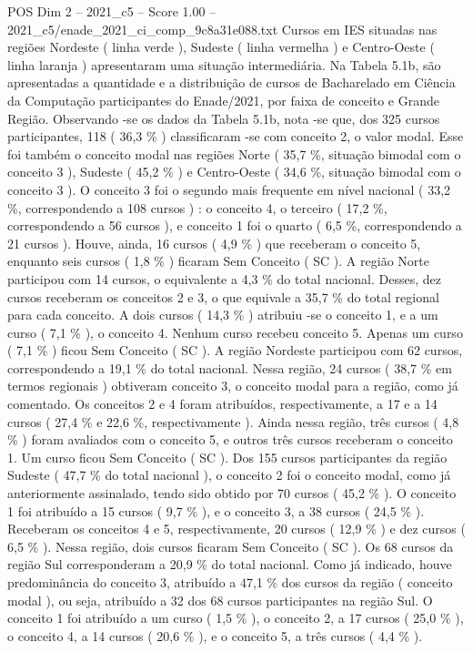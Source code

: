 \begin{textsample}{POS Dim 2 – 2021\_c5 – Score 1.00 – 2021\_c5/enade\_2021\_ci\_comp\_9c8a31e088.txt}
Cursos em IES situadas nas regiões Nordeste ( linha verde ), Sudeste ( linha vermelha ) e Centro-Oeste ( linha laranja ) apresentaram uma situação intermediária.
Na Tabela 5.1b, são apresentadas a quantidade e a distribuição de cursos de Bacharelado em Ciência da Computação participantes do Enade/2021, por faixa de conceito e Grande Região.
Observando -se os dados da Tabela 5.1b, nota -se que, dos 325 cursos participantes, 118 ( 36,3 \% ) classificaram -se com conceito 2, o valor modal.
Esse foi também o conceito modal nas regiões Norte ( 35,7 \%, situação bimodal com o conceito 3 ), Sudeste ( 45,2 \% ) e Centro-Oeste ( 34,6 \%, situação bimodal com o conceito 3 ).
O conceito 3 foi o segundo mais frequente em nível nacional ( 33,2 \%, correspondendo a 108 cursos ) : o conceito 4, o terceiro ( 17,2 \%, correspondendo a 56 cursos ), e conceito 1 foi o quarto ( 6,5 \%, correspondendo a 21 cursos ).
Houve, ainda, 16 cursos ( 4,9 \% ) que receberam o conceito 5, enquanto seis cursos ( 1,8 \% ) ficaram Sem Conceito ( SC ).
A região Norte participou com 14 cursos, o equivalente a 4,3 \% do total nacional.
Desses, dez cursos receberam os conceitos 2 e 3, o que equivale a 35,7 \% do total regional para cada conceito.
A dois cursos ( 14,3 \% ) atribuiu -se o conceito 1, e a um curso ( 7,1 \% ), o conceito 4.
Nenhum curso recebeu conceito 5.
Apenas um curso ( 7,1 \% ) ficou Sem Conceito ( SC ).
A região Nordeste participou com 62 cursos, correspondendo a 19,1 \% do total nacional.
Nessa região, 24 cursos ( 38,7 \% em termos regionais ) obtiveram conceito 3, o conceito modal para a região, como já comentado.
Os conceitos 2 e 4 foram atribuídos, respectivamente, a 17 e a 14 cursos ( 27,4 \% e 22,6 \%, respectivamente ).
Ainda nessa região, três cursos ( 4,8 \% ) foram avaliados com o conceito 5, e outros três cursos receberam o conceito 1.
Um curso ficou Sem Conceito ( SC ).
Dos 155 cursos participantes da região Sudeste ( 47,7 \% do total nacional ), o conceito 2 foi o conceito modal, como já anteriormente assinalado, tendo sido obtido por 70 cursos ( 45,2 \% ).
O conceito 1 foi atribuído a 15 cursos ( 9,7 \% ), e o conceito 3, a 38 cursos ( 24,5 \% ).
Receberam os conceitos 4 e 5, respectivamente, 20 cursos ( 12,9 \% ) e dez cursos ( 6,5 \% ).
Nessa região, dois cursos ficaram Sem Conceito ( SC ).
Os 68 cursos da região Sul corresponderam a 20,9 \% do total nacional.
Como já indicado, houve predominância do conceito 3, atribuído a 47,1 \% dos cursos da região ( conceito modal ), ou seja, atribuído a 32 dos 68 cursos participantes na região Sul.
O conceito 1 foi atribuído a um curso ( 1,5 \% ), o conceito 2, a 17 cursos ( 25,0 \% ), o conceito 4, a 14 cursos ( 20,6 \% ), e o conceito 5, a três cursos ( 4,4 \% ).

\end{textsample}
